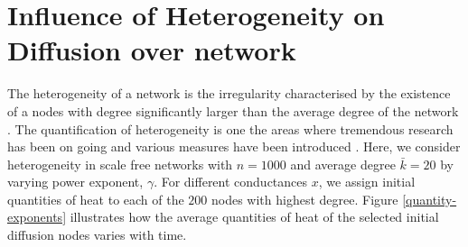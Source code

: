 \documentclass[10pt,a4paper]{article}
\begin{document}
\section{Influence of Heterogeneity on Diffusion over network}
The heterogeneity of a network is the irregularity characterised by the existence of a nodes with degree significantly larger than the average degree of the network \cite{estrada2010quantifying,albert2002statistical,newman2003structure}.
The quantification of heterogeneity is one the areas where tremendous research has been on going and various measures have been introduced \cite{estrada2010quantifying}.
Here, we consider heterogeneity in scale free networks with $n=1000$ and average degree $\bar{k}=20$ by varying power exponent, $\gamma$. For different conductances $x$, we assign initial quantities of heat to each of the $200$ nodes with highest degree. Figure \ref{quantity-exponents} illustrates how the average quantities of heat of the selected initial diffusion nodes varies with time.
\end{document}

